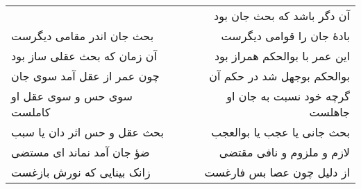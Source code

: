 \begin{center}
\begin{longtable}{l p{0.5cm} r}
&&
آن دگر باشد که بحث جان بود
\\
بحث جان اندر مقامی دیگرست
&&
بادهٔ جان را قوامی دیگرست
\\
آن زمان که بحث عقلی ساز بود
&&
این عمر با بوالحکم همراز بود
\\
چون عمر از عقل آمد سوی جان
&&
بوالحکم بوجهل شد در حکم آن
\\
سوی حس و سوی عقل او کاملست
&&
گرچه خود نسبت به جان او جاهلست
\\
بحث عقل و حس اثر دان یا سبب
&&
بحث جانی یا عجب یا بوالعجب
\\
ضؤ جان آمد نماند ای مستضی
&&
لازم و ملزوم و نافی مقتضی
\\
زانک بینایی که نورش بازغست
&&
از دلیل چون عصا بس فارغست
\\
\end{longtable}
\end{center}
